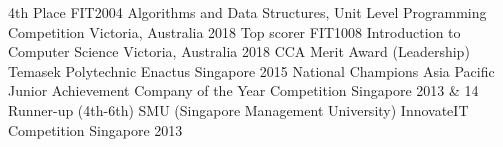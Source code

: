 \begin{cvhonors}
   \cvhonor
    {4th Place}
    {FIT2004 Algorithms and Data Structures, Unit Level Programming Competition}
    {Victoria, Australia}
    {2018}
  \cvhonor
    {Top scorer}
    {FIT1008 Introduction to Computer Science}
    {Victoria, Australia}
    {2018}
  \cvhonor
    {CCA Merit Award (Leadership)}
    {Temasek Polytechnic Enactus}
    {Singapore}
    {2015}
  \cvhonor
    {National Champions}
    {Asia Pacific Junior Achievement Company of the Year Competition}
    {Singapore}
    {2013 \& 14}
  \cvhonor
    {Runner-up (4th-6th)}
    {SMU (Singapore Management University) InnovateIT Competition}
    {Singapore}
    {2013}
\end{cvhonors}
